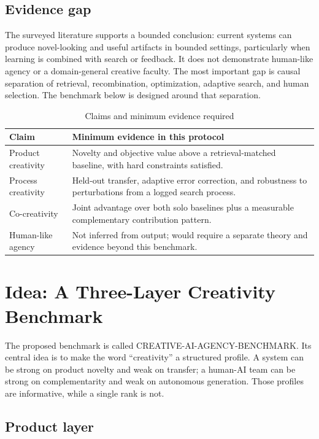 \documentclass[conference]{IEEEtran}
\begin{document}
\subsection{Evidence gap}

The surveyed literature supports a bounded conclusion: current systems can produce
novel-looking and useful artifacts in bounded settings, particularly when learning is
combined with search or feedback. It does not demonstrate human-like agency or a
domain-general creative faculty. The most important gap is causal separation of
retrieval, recombination, optimization, adaptive search, and human selection. The
benchmark below is designed around that separation.

\begin{table}[t]
\caption{Claims and minimum evidence required}
\label{tab:claims}
\centering
\footnotesize
\begin{tabular}{p{}p{}}
\hline
Claim & Minimum evidence in this protocol \\
\hline
Product creativity & Novelty and objective value above a retrieval-matched baseline, with hard constraints satisfied. \\
Process creativity & Held-out transfer, adaptive error correction, and robustness to perturbations from a logged search process. \\
Co-creativity & Joint advantage over both solo baselines plus a measurable complementary contribution pattern. \\
Human-like agency & Not inferred from output; would require a separate theory and evidence beyond this benchmark. \\
\hline
\end{tabular}
\end{table}

\section{Idea: A Three-Layer Creativity Benchmark}
\label{sec:idea}

The proposed benchmark is called CREATIVE-AI-AGENCY-BENCHMARK. Its central idea is to
make the word ``creativity'' a structured profile. A system can be strong on product
novelty and weak on transfer; a human-AI team can be strong on complementarity and weak
on autonomous generation. Those profiles are informative, while a single rank is not.

\subsection{Product layer}
\end{document}
